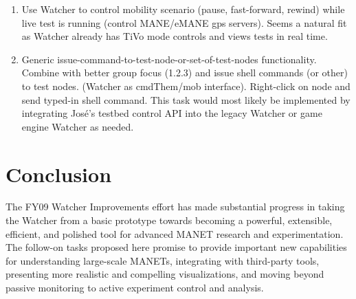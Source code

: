 \documentclass{report}
\begin{document}
\begin{enumerate}
\begin{enumerate}
    \item Use Watcher to control mobility scenario (pause, fast-forward, rewind) while live test is running (control MANE\slash eMANE gps servers). Seems a natural fit as Watcher already has TiVo mode controls and views tests in real time. 
    \item Generic issue-command-to-test-node-or-set-of-test-nodes functionality. Combine with better group focus (1.2.3) and issue shell commands (or other) to test nodes. (Watcher as cmdThem\slash mob interface). Right-click on node and send typed-in shell command. This task would most likely be implemented by integrating Jos\'{e}'s testbed control API into the legacy Watcher or game engine Watcher as needed. 
\end{enumerate}
\end{enumerate}

\section{Conclusion}


The FY09 Watcher Improvements effort has made substantial progress
in taking the Watcher from a basic prototype towards becoming a
powerful, extensible, efficient, and polished tool for advanced MANET
research and experimentation.  The follow-on tasks proposed here
promise to provide important new capabilities for understanding
large-scale MANETs, integrating with third-party tools, presenting 
more realistic and compelling visualizations, and moving beyond passive 
monitoring to active experiment control and analysis. 
\end{document}
